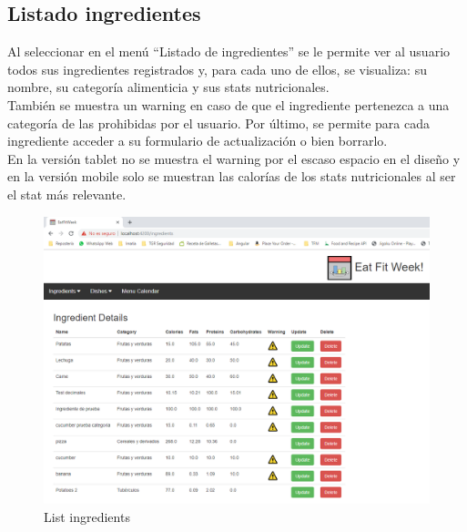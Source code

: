 \documentclass[12pt, a4paper, twoside]{book}
\begin{document}
	\subsection{Listado ingredientes}
	Al seleccionar en el menú ``Listado de ingredientes'' se le permite ver al usuario todos sus ingredientes registrados y, para cada uno de ellos, se visualiza: su nombre, su categoría alimenticia y sus stats nutricionales.\\ También se muestra un warning en caso de que el ingrediente pertenezca a una categoría de las prohibidas por el usuario. Por último, se permite para cada ingrediente acceder a su formulario de actualización o bien borrarlo.\\
	En la versión tablet no se muestra el warning por el escaso espacio en el diseño y en la versión mobile solo se muestran las calorías de los stats nutricionales al ser el stat más relevante.
	\begin{figure}[H]
		\centering
		\includegraphics[width=15cm]{Imagenes/MU-ListIngredients.png}
		\caption{List ingredients}\label{List ingredients}
	\end{figure}
\end{document}
